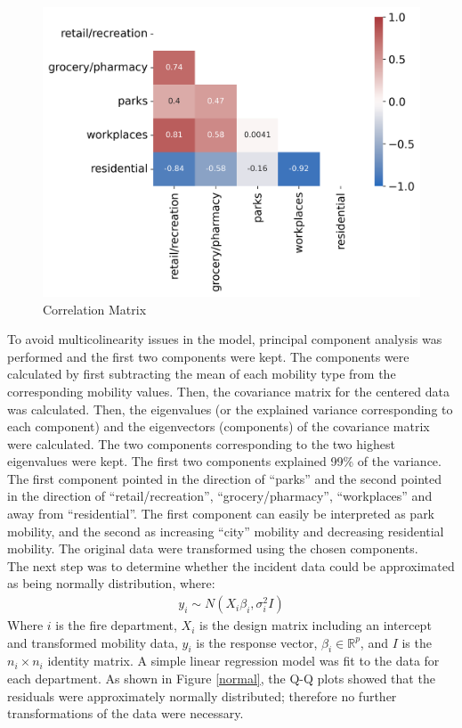 \documentclass[paper=a4, fontsize=11pt]{scrartcl}
\begin{document}
\begin{figure}[!htb]\label{corr_mat}
\centering
\includegraphics[width=.7\textwidth]{corr.png}
\caption{Correlation Matrix}
\end{figure}

To avoid multicolinearity issues in the model, principal component analysis was performed and the first two components were kept. The components were calculated by first subtracting the mean of each mobility type from the corresponding mobility values. Then, the covariance matrix for the centered data was calculated. Then, the eigenvalues (or the explained variance corresponding to each component) and the eigenvectors (components) of the covariance matrix were calculated. The two components corresponding to the two highest eigenvalues were kept. The first two components explained 99\% of the variance. The first component  pointed in the direction of ``parks'' and the second pointed in the direction of ``retail/recreation'', ``grocery/pharmacy'', ``workplaces'' and away from ``residential''. The first component can easily be interpreted as park mobility, and the second as increasing ``city'' mobility and decreasing residential mobility. The original data were transformed using the chosen components.\\

The next step was to determine whether the incident data could be approximated as being normally distribution, where:
\begin{align*}
    y_i \sim N(X_i \beta_i, \sigma_i^2I)
\end{align*}
Where $i$ is the fire department, $X_i$ is the design matrix including an intercept and transformed mobility data, $y_i$ is the response vector, $\beta_i \in \mathbb{R}^{p}$, and $I$ is the $n_i \times n_i$ identity matrix.  A simple linear regression model was fit to the data for each department. As shown in Figure \ref{normal}, the Q-Q plots showed  that the residuals were approximately normally distributed; therefore no further transformations of the data were necessary.\\
\end{document}
